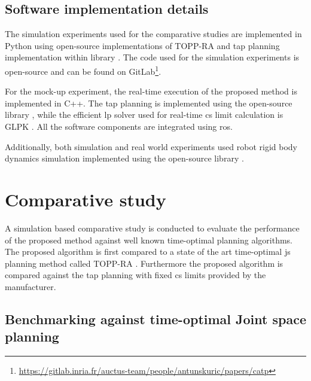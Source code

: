\subsection{Software implementation details}
The simulation experiments used for the comparative studies are implemented in Python
using open-source implementations of TOPP-RA \cite{Pham2018} and \gls{tap} planning implementation within  library \cite{ruckig}. The code used for the simulation experiments is open-source and can be found on GitLab\footnote{\url{https://gitlab.inria.fr/auctus-team/people/antunskuric/papers/catp}}.

For the mock-up experiment, the real-time execution of the proposed method is implemented in C++. The \gls{tap} planning is implemented using the open-source library  \cite{ruckig}, while the efficient \gls{lp} solver used for real-time \gls{cs} limit calculation is GLPK \cite{glpk}. All the software components are integrated using \gls{ros}.

Additionally, both simulation and real world experiments used robot rigid body dynamics simulation implemented using the open-source library  \cite{pinocchio2021}. 



\section{Comparative study}
\label{ch:comp_study}
A simulation based comparative study is conducted to evaluate the performance of the proposed method against well known time-optimal planning algorithms. The proposed algorithm is first compared to a state of the art time-optimal \gls{js} planning method called TOPP-RA \cite{Pham2018}. Furthermore the proposed algorithm is compared against the \gls{tap} planning with fixed \gls{cs} limits provided by the manufacturer.

\subsection{Benchmarking against time-optimal Joint space planning}

